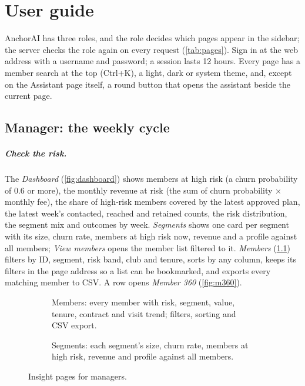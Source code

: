 \chapter{User guide}
\label{app:userguide}

AnchorAI has three roles, and the role decides which pages appear in the sidebar; the server checks the role again on every request (\cref{tab:pages}). Sign in at the web address with a username and password; a session lasts 12 hours. Every page has a member search at the top (Ctrl+K), a light, dark or system theme, and, except on the Assistant page itself, a round button that opens the assistant beside the current page.

\section{Manager: the weekly cycle}

\paragraph{Check the risk.} The \emph{Dashboard} (\cref{fig:dashboard}) shows members at high risk (a churn probability of 0.6 or more), the monthly revenue at risk (the sum of churn probability × monthly fee), the share of high-risk members covered by the latest approved plan, the latest week's contacted, reached and retained counts, the risk distribution, the segment mix and outcomes by week. \emph{Segments} shows one card per segment with its size, churn rate, members at high risk now, revenue and a profile against all members; \emph{View members} opens the member list filtered to it. \emph{Members} (\cref{fig:ug-members}) filters by ID, segment, risk band, club and tenure, sorts by any column, keeps its filters in the page address so a list can be bookmarked, and exports every matching member to CSV. A row opens \emph{Member 360} (\cref{fig:m360}).

\begin{figure}[tb]
  \centering
  \begin{subfigure}[t]{0.495\linewidth}
    \caption{Members: every member with risk, segment, value, tenure, contract and visit trend; filters, sorting and CSV export.}
    \label{fig:ug-members}
  \end{subfigure}\hfill
  \begin{subfigure}[t]{0.495\linewidth}
    \caption{Segments: each segment's size, churn rate, members at high risk, revenue and profile against all members.}
  \end{subfigure}
  \caption{Insight pages for managers.}
\end{figure}

